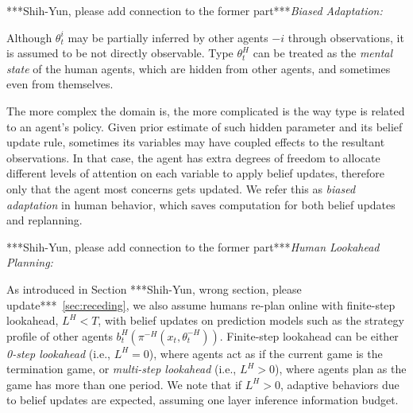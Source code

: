 \documentclass[letterpaper, 10 pt, conference]{ieeeconf}  %
\begin{document}
***Shih-Yun, please add connection to the former part***\textit{Biased Adaptation:}

Although $\theta^i_t$ may be partially inferred by other agents $-i$ through 
observations, it is assumed to be not directly observable. 
Type $\theta^H_t$ can be treated as 
the \textit{mental state} of the human agents, which are 
hidden from other agents, and sometimes even from themselves.  

The more complex the domain is, the more complicated is the way type is related 
to an agent's policy. Given prior estimate of such hidden parameter and its 
belief update rule, sometimes its variables may have coupled effects to the 
resultant observations. In that case, the agent has extra degrees of freedom to 
allocate different levels of attention on 
each variable to apply belief updates, therefore only that the 
agent most concerns gets updated. We refer this as \textit{biased adaptation} in human 
behavior, which saves computation for both belief updates and replanning.  

***Shih-Yun, please add connection to the former part***\textit{Human Lookahead Planning:}

As introduced in Section ***Shih-Yun, wrong section, please update***~\ref{sec:receding}, we also assume humans re-plan 
online with finite-step lookahead, $L^H<T$, with belief updates on prediction 
models such as the strategy profile of other agents 
$b^H_t(\pi^{-H}(x_t,\theta^{-H}_t))$. Finite-step lookahead can be either 
\textit{0-step lookahead} (i.e., $L^H=0$), where agents act as if the current 
game is the termination game, or \textit{multi-step lookahead} (i.e., $L^H>0$), 
where agents plan as the game has more than one period. We note that if $L^H>0$, 
adaptive behaviors due to belief updates are expected, assuming one layer inference information budget.
\end{document}
